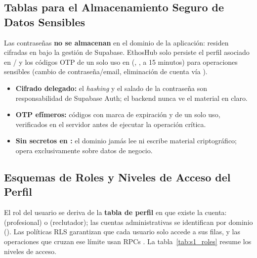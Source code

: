 \subsection{Tablas para el Almacenamiento Seguro de Datos Sensibles}
\label{ssec:s1_db_credenciales}
Las contraseñas \textbf{no se almacenan} en el dominio de la aplicación: residen cifradas en
 bajo la gestión de Supabase. EthosHub solo persiste el perfil asociado en
 /  y los códigos OTP de un solo uso
en  (, ,
 a 15 minutos) para operaciones sensibles (cambio de contraseña/email,
eliminación de cuenta vía ).

\begin{itemize}[noitemsep]
    \item \textbf{Cifrado delegado:} el \textit{hashing} y el salado de la contraseña son
    responsabilidad de Supabase Auth; el backend nunca ve el material en claro.
    \item \textbf{OTP efímeros:} códigos con marca de expiración y de un solo uso, verificados en
    el servidor antes de ejecutar la operación crítica.
    \item \textbf{Sin secretos en :} el dominio jamás lee ni escribe material
    criptográfico; opera exclusivamente sobre datos de negocio.
\end{itemize}

\subsection{Esquemas de Roles y Niveles de Acceso del Perfil}
\label{ssec:s1_db_roles}
El rol del usuario se deriva de la \textbf{tabla de perfil} en que existe la cuenta:
 (profesional) o  (reclutador); las cuentas
administrativas se identifican por dominio (). Las políticas RLS
garantizan que cada usuario solo accede a sus filas, y las operaciones que cruzan ese límite usan
RPCs . La tabla~\ref{tab:s1_roles} resume los niveles de acceso.

